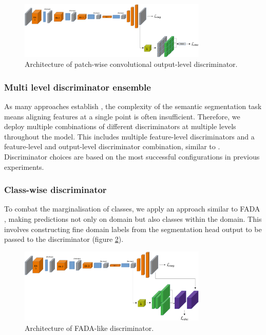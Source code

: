 \documentclass[a4paper,12pt]{report}
\begin{document}
\bigbreak
\begin{figure}[h]
    \centering
    \includegraphics[width=0.8\textwidth]{res/discriminator-diagrams/patch-convolutional-output.pdf}
    \caption{Architecture of patch-wise convolutional output-level discriminator.}
    \label{fig:das-discriminators-patch-conv-output}
\end{figure}

\subsubsection{Multi level discriminator ensemble}
As many approaches establish \cite{hoffman_fcns_2016} \cite{bermudez-chacon_domain-adaptive_2018}, the complexity of the semantic segmentation task means aligning features at a single point is often insufficient. Therefore, we deploy multiple combinations of different discriminators at multiple levels throughout the model. This includes multiple feature-level discriminators and a feature-level and output-level discriminator combination, similar to \cite{tsai_learning_2020}. Discriminator choices are based on the most successful configurations in previous experiments.

\subsubsection{Class-wise discriminator}
To combat the marginalisation of classes, we apply an approach similar to FADA \cite{wang_classes_2020}, making predictions not only on domain but also classes within the domain. This involves constructing fine domain labels from the segmentation head output to be passed to the discriminator (figure \ref{fig:das-discriminators-fada}).

\bigbreak
\begin{figure}[h]
    \centering
    \includegraphics[width=0.8\textwidth]{res/discriminator-diagrams/fada.pdf}
    \caption{Architecture of FADA-like discriminator.}
    \label{fig:das-discriminators-fada}
\end{figure}
\end{document}
